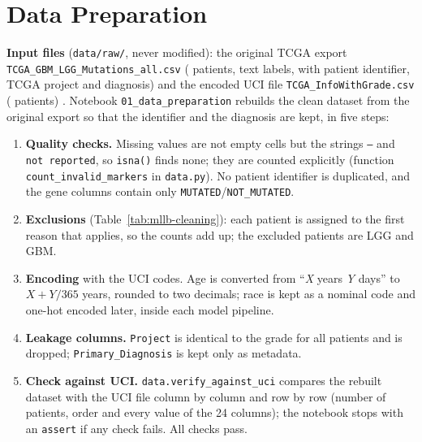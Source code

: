 \section{Data Preparation}

\textbf{Input files} (\texttt{data/raw/}, never modified): the original TCGA export
\texttt{TCGA\_\allowbreak{}GBM\_\allowbreak{}LGG\_\allowbreak{}Mutations\_\allowbreak{}all.\allowbreak{}csv} (\NRaw{} patients, text labels, with patient identifier,
TCGA project and diagnosis) and the encoded UCI file \texttt{TCGA\_\allowbreak{}InfoWithGrade.\allowbreak{}csv} (\NClean{}
patients) \cite{tasci2022dataset}. Notebook \texttt{01\_\allowbreak{}data\_\allowbreak{}preparation} rebuilds the clean dataset
from the original export so that the identifier and the diagnosis are kept, in five steps:

\begin{enumerate}
  \item \textbf{Quality checks.} Missing values are not empty cells but the strings \texttt{--} and
        \texttt{not reported}, so \texttt{isna()} finds none; they are counted
        explicitly (function \texttt{count\_\allowbreak{}invalid\_\allowbreak{}markers} in \texttt{data.py}). No patient identifier is duplicated, and the gene columns contain only
        \texttt{MUTATED}/\texttt{NOT\_MUTATED}.
  \item \textbf{Exclusions} (Table~\ref{tab:mllb-cleaning}): each patient is assigned to the first
        reason that applies, so the counts add up; the excluded patients are \NRemovedLGG{} LGG and
        \NRemovedGBM{} GBM.
  \item \textbf{Encoding} with the UCI codes. Age is converted from ``\textit{X} years \textit{Y}
        days'' to $X + Y/365$ years, rounded to two decimals; race is kept as a nominal code and
        one-hot encoded later, inside each model pipeline.
  \item \textbf{Leakage columns.} \texttt{Project} is identical to the grade for all \NRaw{} patients
        and is dropped; \texttt{Primary\_\allowbreak{}Diagnosis} is kept only as metadata.
  \item \textbf{Check against UCI.} \texttt{data.\allowbreak{}verify\_\allowbreak{}against\_\allowbreak{}uci} compares the rebuilt dataset with
        the UCI file column by column and row by row (number of patients, order and every value of the
        24 columns); the notebook stops with an \texttt{assert} if any check fails. All checks pass.
\end{enumerate}

